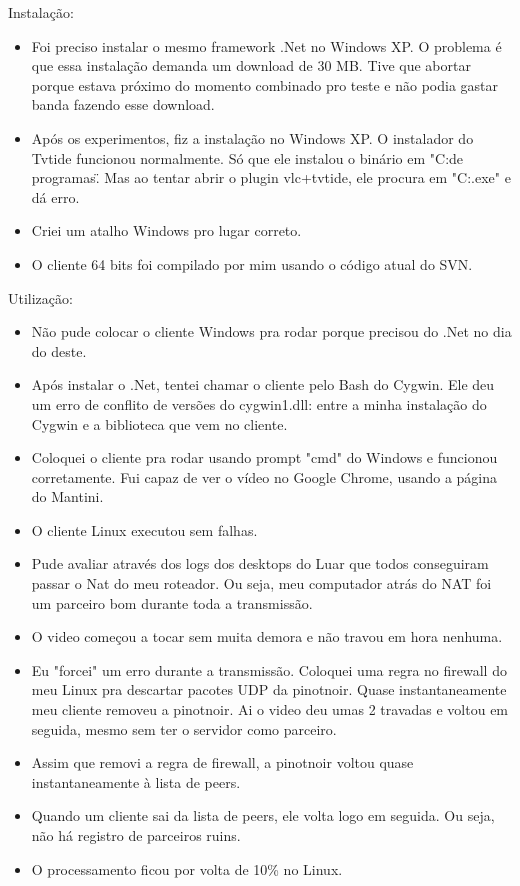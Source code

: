 \documentclass[12pt]{article}
\begin{document}
Instalação:
\begin{itemize}
\item Foi preciso instalar o mesmo framework .Net no Windows XP. O problema é que essa instalação demanda um download de 30 MB. Tive que abortar porque estava próximo do momento combinado pro teste e não podia gastar banda fazendo esse download.
\item Após os experimentos, fiz a instalação no Windows XP. O instalador do Tvtide funcionou normalmente. Só que ele instalou o binário em "C:\Arquivos de programas\Microsoft\Tvtide\". Mas ao tentar abrir o plugin vlc+tvtide, ele procura em "C:\Tvtide\Tvtide.exe" e dá erro.
\item Criei um atalho Windows pro lugar correto.
\item O cliente 64 bits foi compilado por mim usando o código atual do SVN.
\end{itemize}

Utilização:
\begin{itemize}
\item Não pude colocar o cliente Windows pra rodar porque precisou do .Net no dia do deste.
\item Após instalar o .Net, tentei chamar o cliente pelo Bash do Cygwin. Ele deu um erro de conflito de versões do cygwin1.dll: entre a minha instalação do Cygwin e a biblioteca que vem no cliente.
\item Coloquei o cliente pra rodar usando prompt "cmd" do Windows e funcionou corretamente. Fui capaz de ver o vídeo no Google Chrome, usando a página do Mantini.
\item O cliente Linux executou sem falhas.
\item Pude avaliar através dos logs dos desktops do Luar que todos conseguiram passar o Nat do meu roteador. Ou seja, meu computador atrás do NAT foi um parceiro bom durante toda a transmissão.
\item O video começou a tocar sem muita demora e não travou em hora nenhuma.
\item Eu "forcei" um erro durante a transmissão. Coloquei uma regra no firewall do meu Linux pra descartar pacotes UDP da pinotnoir. Quase instantaneamente meu cliente removeu a pinotnoir. Ai o video deu umas 2 travadas e voltou em seguida, mesmo sem ter o servidor como parceiro.
\item Assim que removi a regra de firewall, a pinotnoir voltou quase instantaneamente à lista de peers.
\item Quando um cliente sai da lista de peers, ele volta logo em seguida. Ou seja, não há registro de parceiros ruins.
\item O processamento ficou por volta de 10\% no Linux.
\end{itemize}
\end{document}
